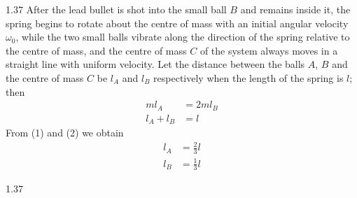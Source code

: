 \begin{solution}{1.37}
After the lead bullet is shot into the small ball $B$ and remains inside it, the spring begins to rotate about the centre of mass with an initial angular velocity $\omega_0$, while the two small balls vibrate along the direction of the spring relative to the centre of mass, and the centre of mass $C$ of the system always moves in a straight line with uniform velocity. Let the distance between the balls $A$, $B$ and the centre of mass $C$ be $l_A$ and $l_B$ respectively when the length of the spring is $l$; then
\begin{align}
ml_A &= 2ml_B \tag{1}\\
l_A+l_B &= l \tag{2}
\end{align}
From (1) and (2) we obtain
\begin{align*}
l_A &= \frac{2}{3}l\\
l_B &= \frac{1}{3}l
\end{align*}

\begin{figbox}{1.37}
\end{figbox}


\end{solution}

